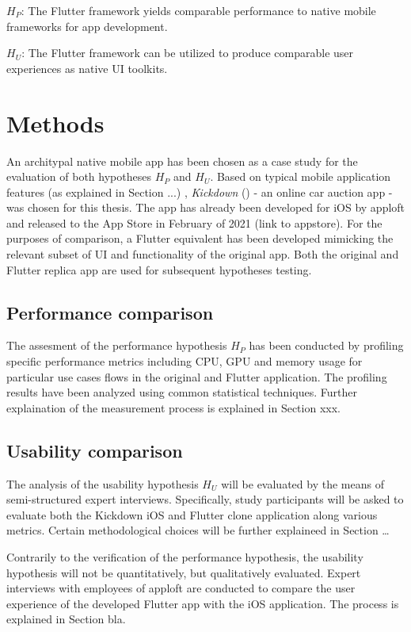 \textbf{$H_P$}: The Flutter framework yields comparable performance to native mobile frameworks for app development.

\textbf{$H_U$}: The Flutter framework can be utilized to produce comparable user experiences as native UI toolkits.

\section{Methods}
An architypal native mobile app has been chosen as a case study for the evaluation of both hypotheses $H_P$ and $H_U$.
Based on typical mobile application features (as explained in Section ...) , \textit{Kickdown} (\cite{Kickdown2021}) - an online car auction app - was chosen for this thesis. 
The app has already been developed for iOS by apploft and released to the App Store in February of 2021 (link to appstore).
For the purposes of comparison, a Flutter equivalent has been developed mimicking the relevant subset of UI and functionality of the original app. 
Both the original and Flutter replica app are used for subsequent hypotheses testing.


\subsection{Performance comparison}
The assesment of the performance hypothesis $H_P$ has been conducted by profiling specific performance metrics including CPU, GPU and memory usage 
for particular use cases flows in the original and Flutter application. 
The profiling results have been analyzed using common statistical techniques.
Further explaination of the measurement process is explained in Section xxx.

\subsection{Usability comparison}
The analysis of the usability hypothesis $H_U$ will be evaluated by the means of semi-structured expert interviews.
Specifically, study participants will be asked to evaluate both the Kickdown iOS and Flutter clone application along various metrics.
Certain methodological choices will be further explaineed in Section \dots

Contrarily to the verification of the performance hypothesis, the usability hypothesis will not be quantitatively, but qualitatively evaluated.
Expert interviews with employees of apploft are conducted to compare the user experience of the developed Flutter app with the iOS application.
The process is explained in Section bla.

